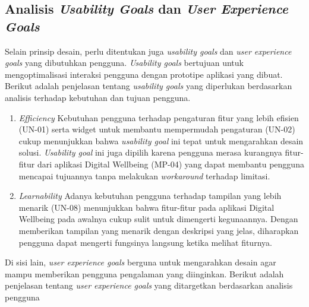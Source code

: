\subsection{Analisis \textit{Usability Goals} dan \textit{User Experience Goals}}
\label{subsec:analisis_goals}

Selain prinsip desain, perlu ditentukan juga \textit{usability goals} dan \textit{user experience goals} yang dibutuhkan pengguna. \textit{Usability goals} bertujuan untuk mengoptimalisasi interaksi pengguna dengan prototipe aplikasi yang dibuat. Berikut adalah penjelasan tentang \textit{usability goals} yang diperlukan berdasarkan analisis terhadap kebutuhan dan tujuan pengguna.

\begin{enumerate}
  \item \textit{Efficiency}
  \subitem Kebutuhan pengguna terhadap pengaturan fitur yang lebih efisien (UN-01) serta widget untuk membantu mempermudah pengaturan (UN-02) cukup menunjukkan bahwa \textit{usability goal} ini tepat untuk mengarahkan desain solusi. \textit{Usability goal} ini juga dipilih karena pengguna merasa kurangnya fitur-fitur dari aplikasi Digital Wellbeing (MP-04) yang dapat membantu pengguna mencapai tujuannya tanpa melakukan \textit{workaround} terhadap limitasi.

  \item \textit{Learnability}
  \subitem Adanya kebutuhan pengguna terhadap tampilan yang lebih menarik (UN-08) menunjukkan bahwa fitur-fitur pada aplikasi Digital Wellbeing pada awalnya cukup sulit untuk dimengerti kegunaannya. Dengan memberikan tampilan yang menarik dengan deskripsi yang jelas, diharapkan pengguna dapat mengerti fungsinya langsung ketika melihat fiturnya.
  
\end{enumerate}

Di sisi lain, \textit{user experience goals} berguna untuk mengarahkan desain agar mampu memberikan pengguna pengalaman yang diinginkan. Berikut adalah penjelasan tentang \textit{user experience goals} yang ditargetkan berdasarkan analisis pengguna

